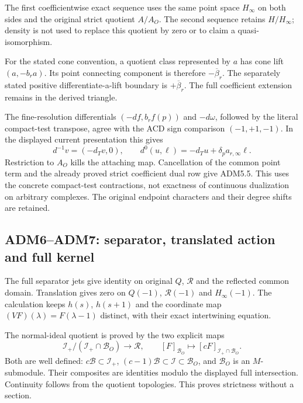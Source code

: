 The first coefficientwise exact sequence uses the same point space
\(H_\infty\) on both sides and the original strict quotient \(A/A_O\).
The second sequence retains \(H/H_\infty\); density is not used to
replace this quotient by zero or to claim a quasi-isomorphism.

For the stated cone convention, a quotient class represented by \(a\)
has cone lift \((a,-b_ra)\). Its point connecting component is therefore
\(-\overline\beta_r\). The separately stated positive
differentiate-a-lift boundary is \(+\overline\beta_r\). The full
coefficient extension remains in the derived triangle.

The fine-resolution differentials \((-df,b_rf(p))\) and \(-d\omega\),
followed by the literal compact-test transpose, agree with the ACD sign
comparison \((-1,+1,-1)\). In the displayed current presentation this
gives \[
d^{-1}v=(-d_Tv,0),\qquad
d^0(u,\ell)=-d_Tu+\delta_pa_{r,\infty}\ell.
\] Restriction to \(A_O\) kills the attaching map. Cancellation of the
common point term and the already proved strict coefficient dual row
give ADM5.5. This uses the concrete compact-test contractions, not
exactness of continuous dualization on arbitrary complexes. The original
endpoint characters and their degree shifts are retained.

\subsection{ADM6--ADM7: separator, translated action and full
kernel}\label{adm6adm7-separator-translated-action-and-full-kernel}

The full separator jets give identity on original \(Q\), \(\mathcal R\)
and the reflected common domain. Translation gives zero on \(Q(-1)\),
\(\mathcal R(-1)\) and \(H_\infty(-1)\). The calculation keeps \(h(s)\),
\(h(s+1)\) and the coordinate map \((VF)(\lambda)=F(\lambda-1)\)
distinct, with their exact intertwining equation.

The normal-ideal quotient is proved by the two explicit maps \[
\mathcal I_+/(\mathcal I_+\cap\mathcal B_O)
\longrightarrow\mathcal R,
\qquad
[F]_{\mathcal B_O}\longmapsto[cF]_{\mathcal I_+\cap\mathcal B_O}.
\] Both are well defined: \(c\mathcal B\subset\mathcal I_+\),
\((c-1)\mathcal B\subset\mathcal I\subset\mathcal B_O\), and
\(\mathcal B_O\) is an \(M\)-submodule. Their composites are identities
modulo the displayed full intersection. Continuity follows from the
quotient topologies. This proves strictness without a section.


